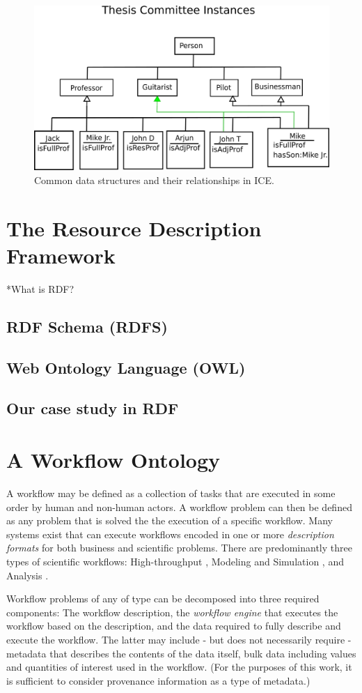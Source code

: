 \begin{figure}[htbp]
\centering
\includegraphics[width=\textwidth]{figures/tc-ont-instances.png}
\caption{Common data structures and their relationships in ICE.}
\label{data-arch}
\end{figure}


\section{The Resource Description Framework}

*What is RDF?

\subsection{RDF Schema (RDFS)}

\subsection{Web Ontology Language (OWL)}

\subsection{Our case study in RDF}

\section{A Workflow Ontology}

A workflow may be defined as a collection of tasks that are executed in some order by human and non-human actors. A workflow problem can then be defined as any problem that is solved the the execution of a specific workflow. Many systems exist that can execute workflows encoded in one or more \textit{description formats} for both business and scientific problems. There are predominantly three types of scientific workflows: High-throughput \cite{}, Modeling and Simulation \cite{}, and Analysis \cite{}.

Workflow problems of any of type can be decomposed into three required components: The workflow description, the \textit{workflow engine} that executes the workflow based on the description, and the data required to fully describe and execute the workflow. The latter may include - but does not necessarily require - metadata that describes the contents of the data itself, bulk data including values and quantities of interest used in the workflow. (For the purposes of this work, it is sufficient to consider provenance information as a type of metadata.)